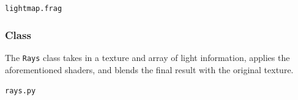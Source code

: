 \documentclass[../main/main.tex]{subfiles}
\begin{document}
\noindent\verb|lightmap.frag|


\subsubsection*{Class}
The \lstinline{Rays} class takes in a texture and array of light information, applies the aforementioned shaders, and blends the final result with the original texture.

\noindent\verb|rays.py|

\end{document}
